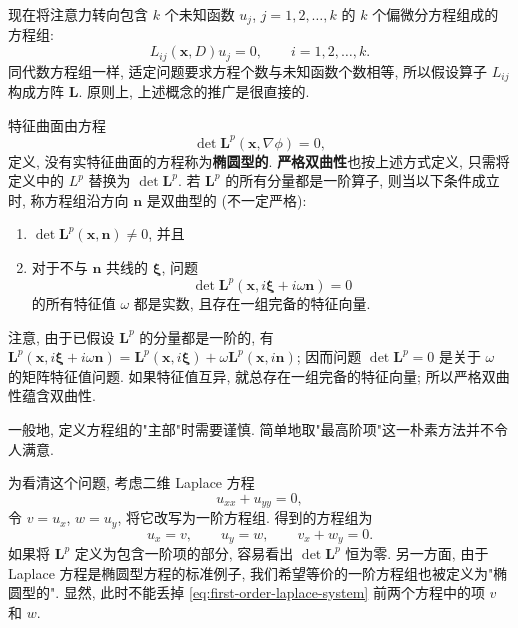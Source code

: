现在将注意力转向包含 $k$ 个未知函数 $u_j$, $j=1,2,\ldots,k$ 的 $k$ 个偏微分方程组成的方程组:
\begin{equation}\label{eq:linear-pde-system}
L_{ij}(\bm{x},D)u_j=0,\qquad i=1,2,\ldots,k.
\end{equation}
同代数方程组一样, 适定问题要求方程个数与未知函数个数相等, 所以假设算子 $L_{ij}$ 构成方阵 $\bm{L}$. 原则上, 上述概念的推广是很直接的.

\begin{Definition}
\label{def:system-pde-type}
特征曲面由方程
\begin{equation}\label{eq:system-characteristic-surface}
\det\bm{L}^p(\bm{x},\nabla\phi)=0,
\end{equation}
定义, 没有实特征曲面的方程称为\textbf{椭圆型的}. \textbf{严格双曲性}也按上述方式定义, 只需将定义中的 $L^p$ 替换为 $\det\bm{L}^p$. 若 $\bm{L}^p$ 的所有分量都是一阶算子, 则当以下条件成立时, 称方程组沿方向 $\bm{n}$ 是双曲型的 (不一定严格):
\begin{enumerate}
\item $\det\bm{L}^p(\bm{x},\bm{n})\ne0$, 并且
\item 对于不与 $\bm{n}$ 共线的 $\bm{\xi}$, 问题
\[
\det\bm{L}^p(\bm{x},i\bm{\xi}+i\omega\bm{n})=0
\]
的所有特征值 $\omega$ 都是实数, 且存在一组完备的特征向量.\end{enumerate}
\end{Definition}

注意, 由于已假设 $\bm{L}^p$ 的分量都是一阶的, 有 $\bm{L}^p(\bm{x},i\bm{\xi}+i\omega\bm{n})=\bm{L}^p(\bm{x},i\bm{\xi})+\omega\bm{L}^p(\bm{x},i\bm{n})$; 因而问题 $\det\bm{L}^p=0$ 是关于 $\omega$ 的矩阵特征值问题. 如果特征值互异, 就总存在一组完备的特征向量; 所以严格双曲性蕴含双曲性.

一般地, 定义方程组的"主部"时需要谨慎. 简单地取"最高阶项"这一朴素方法并不令人满意.

\begin{Example}
\label{ex:weighted-laplace-reformulation}
为看清这个问题, 考虑二维 Laplace 方程
\begin{equation}\label{eq:first-order-laplace-reformulation-origin}
u_{xx}+u_{yy}=0,
\end{equation}
令 $v=u_x$, $w=u_y$, 将它改写为一阶方程组. 得到的方程组为
\begin{equation}\label{eq:first-order-laplace-system}
u_x=v,\qquad u_y=w,\qquad v_x+w_y=0.
\end{equation}
如果将 $\bm{L}^p$ 定义为包含一阶项的部分, 容易看出 $\det\bm{L}^p$ 恒为零. 另一方面, 由于 Laplace 方程是椭圆型方程的标准例子, 我们希望等价的一阶方程组也被定义为"椭圆型的". 显然, 此时不能丢掉 \eqref{eq:first-order-laplace-system} 前两个方程中的项 $v$ 和 $w$.
\end{Example}

